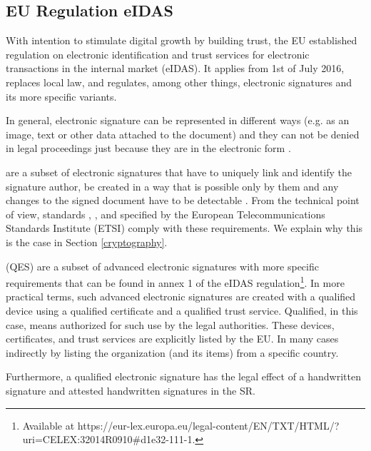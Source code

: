 \documentclass[thesismargins, english, thesislinespacing, onelinechapterstyle, upjsfrontpage]{rnthesis}
\begin{document}
\subsection{EU Regulation eIDAS} \label{eidas}

With intention to stimulate digital growth by building trust, the EU established regulation on electronic identification and trust services for electronic transactions in the internal market (eIDAS).
It applies from 1st of July 2016, replaces local law, and regulates, among other things, electronic signatures and its more specific variants.


In general, electronic signature can be represented in different ways (e.g. as an image, text or other data attached to the document) and they can not be denied in legal proceedings just because they are in the electronic form \cite{eidas}.

 are a subset of electronic signatures that have to uniquely link and identify the signature author, be created in a way that is possible only by them and any changes to the signed document have to be detectable \cite{eidas}.
From the technical point of view, standards , , and  specified by the European Telecommunications Standards Institute (ETSI) comply with these requirements. We explain why this is the case in Section \ref{cryptography}.

 (QES) are a subset of advanced electronic signatures with more specific requirements that can be found in annex 1 of the eIDAS regulation\footnote{Available at https://eur-lex.europa.eu/legal-content/EN/TXT/HTML/?uri=CELEX:32014R0910\#d1e32-111-1.}.
In more practical terms, such advanced electronic signatures are created with a qualified device using a qualified certificate and a qualified trust service.
Qualified, in this case, means authorized for such use by the legal authorities.
These devices, certificates, and trust services are explicitly listed by the EU. In many cases indirectly by listing the organization (and its items) from a specific country.

Furthermore, a qualified electronic signature has the legal effect of a handwritten signature \cite{eidas} and attested handwritten signatures in the SR.
\end{document}
